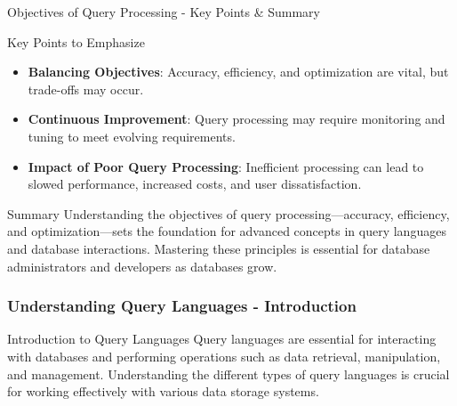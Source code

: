 \documentclass[aspectratio=169]{beamer}
\begin{document}
\begin{frame}[fragile]{Objectives of Query Processing - Key Points & Summary}
    \begin{block}{Key Points to Emphasize}
        \begin{itemize}
            \item \textbf{Balancing Objectives}: Accuracy, efficiency, and optimization are vital, but trade-offs may occur. 
            \item \textbf{Continuous Improvement}: Query processing may require monitoring and tuning to meet evolving requirements.
            \item \textbf{Impact of Poor Query Processing}: Inefficient processing can lead to slowed performance, increased costs, and user dissatisfaction.
        \end{itemize}
    \end{block}

    \begin{block}{Summary}
        Understanding the objectives of query processing—accuracy, efficiency, and optimization—sets the foundation for advanced concepts in query languages and database interactions. Mastering these principles is essential for database administrators and developers as databases grow.
    \end{block}
\end{frame}

\begin{frame}[fragile]
    \frametitle{Understanding Query Languages - Introduction}
    \begin{block}{Introduction to Query Languages}
        Query languages are essential for interacting with databases and performing operations such as data retrieval, manipulation, and management. Understanding the different types of query languages is crucial for working effectively with various data storage systems.
    \end{block}
\end{frame}
\end{document}
